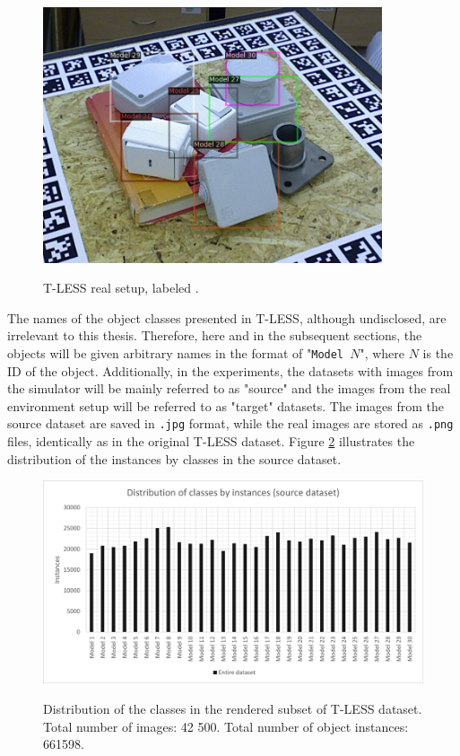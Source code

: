 \begin{figure}[htb]
	\begin{center}
		\includegraphics[width=10cm]{./tless_real_annotated.png}
	\end{center}
	\caption{T-LESS real setup, labeled
\cite{hodan2017tless}.}
	\begin{center}
		\label{tless_real_example}
	\end{center}
\end{figure}

The names of the object classes presented in T-LESS, although undisclosed, are irrelevant to this thesis. Therefore, here and in the subsequent sections, the objects will be given arbitrary names in the format of "\texttt{Model $N$}", where $N$ is the ID of the object. Additionally, in the experiments, the datasets with images from the simulator will be mainly referred to as "source" and the images from the real environment setup will be referred to as "target" datasets. The images from the source dataset are saved in \texttt{.jpg} format, while the real images are stored as \texttt{.png} files, identically as in the original T-LESS \cite{hodan2017tless} dataset. Figure \ref{tless_distribution_rend} illustrates the distribution of the instances by classes in the source dataset.  

\begin{figure}[htb]
	\begin{center}
		\includegraphics[width=14cm]{./rendered_distribution.png}
	\end{center}
	\caption{Distribution of the classes in the rendered subset of T-LESS dataset. Total number of images: 42 500. Total number of object instances: 661598.}
	\begin{center}
		\label{tless_distribution_rend}
	\end{center}
\end{figure}

